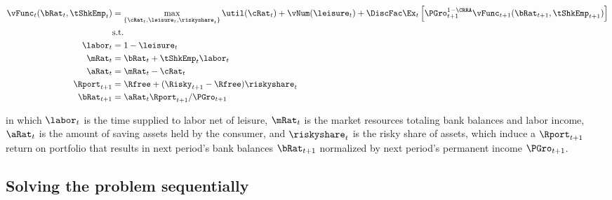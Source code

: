 \documentclass[\econtexRoot/SequentialEGM]{subfiles}
\begin{document}
\begin{equation}
        \begin{split}
                \vFunc_{t}(\bRat_{t}, \tShkEmp_{t}) & = \max_{\{\cRat_{t},
                        \leisure_{t}, \riskyshare_{t}\}} \util(\cRat_{t}) +
                \vNum(\leisure_{t}) +
                \DiscFac \Ex_{t} \left[ \PGro_{t+1}^{1-\CRRA}
                        \vFunc_{t+1} (\bRat_{t+1},
                        \tShkEmp_{t+1}) \right] \\
                & \text{s.t.} \\
                \labor_{t} & = 1 - \leisure_{t} \\
                \mRat_{t} & = \bRat_{t} + \tShkEmp_{t}\labor_{t} \\
                \aRat_{t} & = \mRat_{t} - \cRat_{t} \\
                \Rport_{t+1} & = \Rfree + (\Risky_{t+1} - \Rfree)
                \riskyshare_{t} \\
                \bRat_{t+1} & = \aRat_{t} \Rport_{t+1} / \PGro_{t+1}
        \end{split}
\end{equation}

in which $\labor_{t}$ is the time supplied to labor net of leisure, $\mRat_{t}$ is the market resources totaling bank balances and labor income, $\aRat_{t}$ is the amount of saving assets held by the consumer, and $\riskyshare_{t}$ is the risky share of assets, which induce a $\Rport_{t+1}$ return on portfolio that results in next period's bank balances $\bRat_{t+1}$ normalized by next period's permanent income $\PGro_{t+1}$.


\subsection{Solving the problem sequentially}
\end{document}
